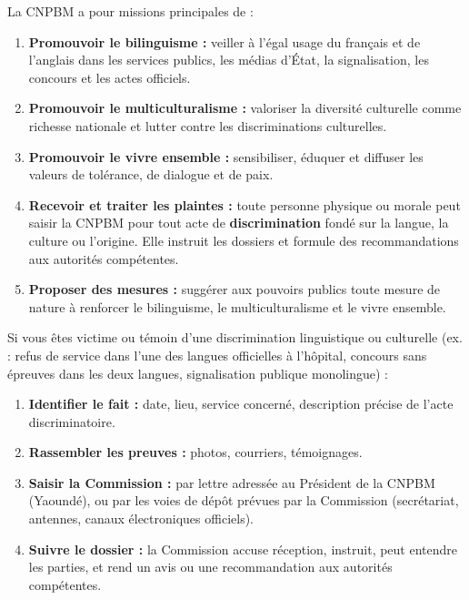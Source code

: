 \documentclass[11pt]{article}
\begin{document}
\begin{propriete}
La CNPBM a pour missions principales de :
\begin{enumerate}
    \item \textbf{Promouvoir le bilinguisme :} veiller à l'égal usage du français et de l'anglais dans les services publics, les médias d'État, la signalisation, les concours et les actes officiels.
    \item \textbf{Promouvoir le multiculturalisme :} valoriser la diversité culturelle comme richesse nationale et lutter contre les discriminations culturelles.
    \item \textbf{Promouvoir le vivre ensemble :} sensibiliser, éduquer et diffuser les valeurs de tolérance, de dialogue et de paix.
    \item \textbf{Recevoir et traiter les plaintes :} toute personne physique ou morale peut saisir la CNPBM pour tout acte de \textbf{discrimination} fondé sur la langue, la culture ou l'origine. Elle instruit les dossiers et formule des recommandations aux autorités compétentes.
    \item \textbf{Proposer des mesures :} suggérer aux pouvoirs publics toute mesure de nature à renforcer le bilinguisme, le multiculturalisme et le vivre ensemble.
\end{enumerate}
\end{propriete}

\begin{methode}
Si vous êtes victime ou témoin d'une discrimination linguistique ou culturelle (ex. : refus de service dans l'une des langues officielles à l'hôpital, concours sans épreuves dans les deux langues, signalisation publique monolingue) :
\begin{enumerate}
    \item \textbf{Identifier le fait :} date, lieu, service concerné, description précise de l'acte discriminatoire.
    \item \textbf{Rassembler les preuves :} photos, courriers, témoignages.
    \item \textbf{Saisir la Commission :} par lettre adressée au Président de la CNPBM (Yaoundé), ou par les voies de dépôt prévues par la Commission (secrétariat, antennes, canaux électroniques officiels).
    \item \textbf{Suivre le dossier :} la Commission accuse réception, instruit, peut entendre les parties, et rend un avis ou une recommandation aux autorités compétentes.
\end{enumerate}
\end{methode}
\end{document}

